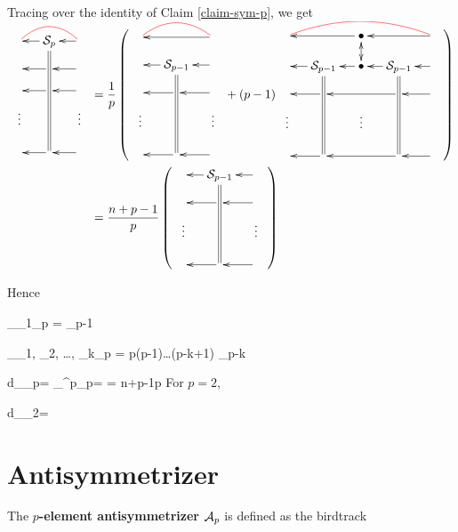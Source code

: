 Tracing over the identity
of Claim \ref{claim-sym-p}, we get
\begin{align}
\bcen
\xymatrix@R=1pc@C=1pc{
&\cals_p\ar@2{-}[dddd]\ar[l]
&\ar[l]
\ar@[red]@{-}@/_1pc/[ll]
\\
&\ar[l]
&\ar[l]
\\
&\ar[l]
&\ar[l]
\\
\vdots&
&\vdots
\\
&\ar[l]
&\ar[l]
}
\ecen
&=
\frac{1}{p}
\left(
\bcen
\xymatrix@R=1pc@C=1pc{
&
&\ar[ll]
\ar@[red]@{-}@/_1pc/[ll]
\\
&\cals_{p-1}\ar@2{-}[ddd]\ar[l]
&\ar[l]
\\
&\ar[l]
&\ar[l]
\\
\vdots&
&\vdots
\\
&\ar[l]
&\ar[l]
}
\ecen
+
(p-1)
\bcen
\xymatrix@R=1pc@C=1pc{
&
&\bullet\ar[ll]\ar@{<->}[d]
&
&\ar[ll]
\ar@[red]@{-}@/_1pc/[llll]
\\
&\cals_{p-1}\ar@2{-}[ddd]\ar[l]
&\bullet\ar[l]
&\cals_{p-1}\ar@2{-}[ddd]\ar[l]
&\ar[l]
\\
&\ar[l]
&&\ar[ll]
&\ar[l]
\\
\vdots&
&\vdots
&
&
\\
&\ar[l]
&
&\ar[ll]
&\ar[l]
}
\ecen
\right)
\\
&=
\frac{n+p-1}{p}
\left(
\bcen
\xymatrix@R=1pc@C=1pc{
&\cals_{p-1}\ar@2{-}[ddd]\ar[l]
&\ar[l]
\\
&\ar[l]
&\ar[l]
\\
\vdots&
&\vdots
\\
&\ar[l]
&\ar[l]
}
\ecen
\right)
\end{align}

Hence

\beq
\tr_{\rva_1}\cals_p = \cals_{p-1}
\eeq

\beq
\tr_{\rva_1, \rva_2, \ldots, \rva_k}\cals_p = 
{p(p-1)\ldots(p-k+1)}
\cals_{p-k}
\eeq

\beq
d_{\cals_p}=
\tr_{\rva^p}\cals_p=
=
{n+p-1\choose p}
\eeq
For $p=2$, 

\beq
d_{\cals_2}=
\eeq

\section{Antisymmetrizer}

The {\bf $p$-element antisymmetrizer} ${\cal A}_p$ is defined as the
birdtrack

